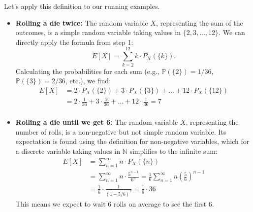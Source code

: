 
\begin{example}
    Let's apply this definition to our running examples.
    \begin{itemize}
        \item \textbf{Rolling a die twice:} The random variable $X$, representing the sum of the outcomes, is a simple random variable taking values in $\{2, 3, \dots, 12\}$. We can directly apply the formula from step 1:
        \[
            E[X] = \sum_{k=2}^{12} k \cdot P_X(\{k\}).
        \]
        Calculating the probabilities for each sum (e.g., $\mathbb{P}(\{2\})=1/36$, $\mathbb{P}(\{3\})=2/36$, etc.), we find:
        \[
            \begin{aligned}
                E[X] &= 2 \cdot P_X(\{2\}) + 3 \cdot P_X(\{3\}) + \dots + 12 \cdot P_X(\{12\}) \\
                &= 2 \cdot \frac{1}{36} + 3 \cdot \frac{2}{36} + \dots + 12 \cdot \frac{1}{36} = 7\\
            \end{aligned}
        \]
        \item \textbf{Rolling a die until we get 6:} The random variable $X$, representing the number of rolls, is a non-negative but not simple random variable. Its expectation is found using the definition for non-negative variables, which for a discrete variable taking values in $\mathbb{N}$ simplifies to the infinite sum:
        \[
            \begin{aligned}
                E[X] &= \sum_{n=1}^{\infty} n \cdot P_X(\{n\}) \\
                &= \sum_{n=1}^{\infty} n \cdot \frac{5^{n-1}}{6^n} = \frac{1}{6} \sum_{n=1}^{\infty} n \left(\frac{5}{6}\right)^{n-1} \\
                &= \frac{1}{6} \cdot \frac{1}{(1 - 5/6)^2} = \frac{1}{6} \cdot 36
            \end{aligned}
        \]
        This means we expect to wait 6 rolls on average to see the first 6.
    \end{itemize}
\end{example}

